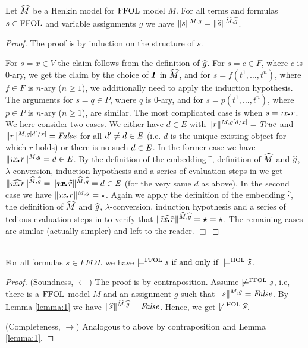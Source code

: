\begin{lem}\label{lemma:1} \sloppy
  Let $\widehat{M}$ be a Henkin model for $\text{\textrm{FFOL}}$ model $M$. For all
  terms and formulas $s\in \text{\textrm{FFOL}}$ and variable assignments $g$ we have $\| s
  \|^{M,g} = \| \widehat{s} \|^{\widehat{M}, \widehat{g}}$.


\begin{proof} 
  The proof is by induction on the structure of $s$.

  For $s=x\in V$ the claim follows from the definition of
  $\widehat{g}$. For $s=c\in F$, where $c$ is $0$-ary, we get the claim by
  the choice of $\boldsymbol{I}$ in $\widehat{M}$, and for $s=f(t^1,\ldots,t^n)$,
  where $f\in F$ is $n$-ary ($n\geq 1$), we additionally need to apply
  the induction hypothesis. The arguments for $s=q\in P$, where $q$ is
  $0$-ary, and for $s=p(t^1,\ldots,t^n)$, where $p\in P$ is $n$-ary
  ($n\geq 1$), are similar.  The most complicated case is when
  $s=\Descr x\lambdot r$. We here consider two cases. We either have
  $d \in E$ with
  $\| r \|^{M,g[d/x]} = \mathit{True}$ and $\| r \|^{M,g[d'/x]} = \mathit{False}$ for
  all $d'\not=d\in \mathit{E}$ (i.e. $d$ is the unique existing object for
  which $r$ holds) or there is no such $d\in \mathit{E}$. In the former case
  we have $\| \Descr x\lambdot r \|^{M,g} = d \in \ex$. By the
  definition of the embedding $\widehat{\cdot}$, definition of $\widehat{M}$ and
  $\widehat{g}$, $\lambda$-conversion, induction hypothesis and a series of evaluation
  steps in \HOL we get
  $\| \map{\Descr x\lambdot r} \|^{\map M, \map g} = \| \hol{\Descr
    x\lambdot} \map{r} \|^{\map M, \map g} = d \in \ex$
  (for the very same $d$ as above). In the second case we have
  $\| \Descr x\lambdot r \|^{M,g} = \star$. Again we apply the
  definition of the embedding $\widehat{\cdot}$, the definition of $\widehat{M}$
  and $\widehat{g}$, $\lambda$-conversion, induction hypothesis and a series of tedious
  evaluation steps in \HOL to verify that
  $\| \map{\Descr x\lambdot r} \|^{\map M, \map g} = \hol{\star} =
  \star$. The remaining cases are similar (actually simpler) and left
  to the reader. $\Box$
\end{proof}
\end{lem}


\begin{thm}\ \\
For all formulas $s\in FFOL$ we have
 $\models^{\text{\textrm{FFOL}}} s \text{ if and only if }  \models^{\text{\textrm{HOL}}} \widehat{s}$.


 \begin{proof} 
 (Soundness, $\leftarrow$) The proof is by
   contraposition. Assume $\not\models^{\text{\textrm{FFOL}}} s$, i.e, there is a
   $\text{\textrm{FFOL}}$ model $M$ and an assignment $g$ such that
   $\|s\|^{M,g}=\mathit{False}$. By Lemma \ref{lemma:1} we have $\| \widehat{s}
   \|^{\widehat{M}, \widehat{g}}=\mathit{False}$. Hence, we get $\not\models^{\text{\textrm{HOL}}} \widehat{s}$.

 (Completeness, $\rightarrow$) Analogous to above by contraposition
 and Lemma \ref{lemma:1}.
\end{proof}
\end{thm} 

